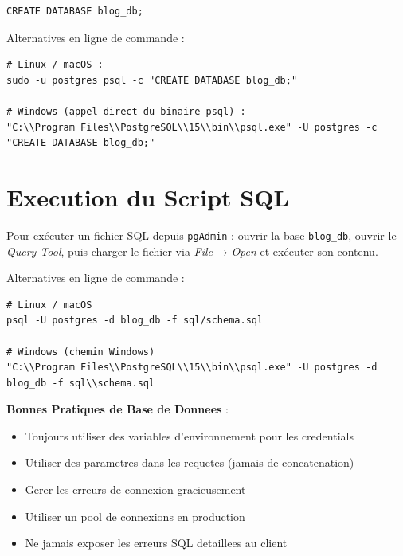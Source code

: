 \documentclass[a4paper,12pt]{book}
\begin{document}
\begin{lstlisting}[style=sql]
CREATE DATABASE blog_db;
\end{lstlisting}

Alternatives en ligne de commande :
\begin{lstlisting}[style=bash, caption=Creation de la base de donnees PostgreSQL]
# Linux / macOS :
sudo -u postgres psql -c "CREATE DATABASE blog_db;"

# Windows (appel direct du binaire psql) :
"C:\\Program Files\\PostgreSQL\\15\\bin\\psql.exe" -U postgres -c "CREATE DATABASE blog_db;"
\end{lstlisting}

\section{Execution du Script SQL}
Pour exécuter un fichier SQL depuis \texttt{pgAdmin} : ouvrir la base \texttt{blog_db},
ouvrir le \emph{Query Tool}, puis charger le fichier via \emph{File} → \emph{Open} et
exécuter son contenu.

Alternatives en ligne de commande :
\begin{lstlisting}[style=bash, caption=Execution du script schema.sql]
# Linux / macOS
psql -U postgres -d blog_db -f sql/schema.sql

# Windows (chemin Windows)
"C:\\Program Files\\PostgreSQL\\15\\bin\\psql.exe" -U postgres -d blog_db -f sql\\schema.sql
\end{lstlisting}

\begin{bestpracticebox}
    \textbf{Bonnes Pratiques de Base de Donnees} :
    \begin{itemize}
        \item Toujours utiliser des variables d'environnement pour les credentials
        \item Utiliser des parametres dans les requetes (jamais de concatenation)
        \item Gerer les erreurs de connexion gracieusement
        \item Utiliser un pool de connexions en production
        \item Ne jamais exposer les erreurs SQL detaillees au client
    \end{itemize}
\end{bestpracticebox}
\end{document}
